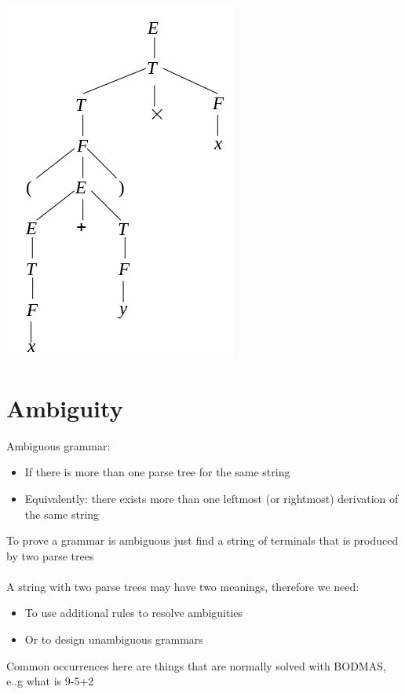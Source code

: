\documentclass{article}[18pt]
\begin{document}
\begin{center}
	\includegraphics[scale=0.7]{"Parse Tree"}
\end{center}
\section{Ambiguity}
Ambiguous grammar:
\begin{itemize}
	\item If there is more than one parse tree for the same string
	\item Equivalently: there exists more than one leftmost (or rightmost) derivation of the same string
\end{itemize}
To prove a grammar is ambiguous just find a string of terminals that is produced by two parse trees\\
\\
A string with two parse trees may have two meanings, therefore we need:
\begin{itemize}
	\item To use additional rules to resolve ambiguities
	\item Or to design unambiguous grammars
\end{itemize}
Common occurrences here are things that are normally solved with BODMAS, e..g what is 9-5+2
\end{document}
